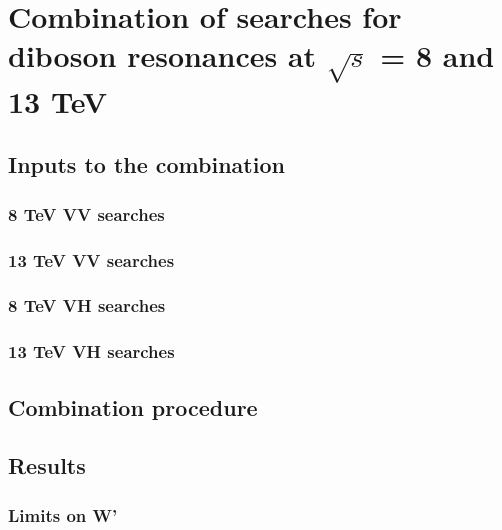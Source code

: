 \chapter{Combination of searches for diboson resonances at $\sqrt{s}$ = 8 and 13 TeV}
\label{ch:combination}

\section{Inputs to the combination}

\subsection{8 TeV VV searches}
\subsection{13 TeV VV searches}
\subsection{8 TeV VH searches}
\subsection{13 TeV VH searches}

\section{Combination procedure}

\section{Results}

\subsection{Limits on W'}

